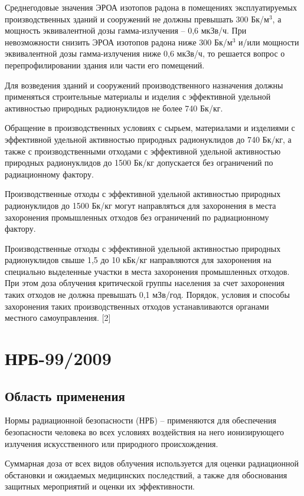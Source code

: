 	Среднегодовые значения ЭРОА изотопов радона в помещениях эксплуатируемых 
	производственных зданий и сооружений не должны превышать 300 Бк/м\(^3\), а 
	мощность эквивалентной дозы гамма-излучения -- 0,6 мкЗв/ч. При 
	невозможности снизить ЭРОА изотопов радона ниже 300 Бк/м\(^3\) и/или мощности 
	эквивалентной дозы гамма-излучения ниже 0,6 мкЗв/ч, то решается вопрос о 
	перепрофилировании здания или части его помещений.
	
	Для возведения зданий и сооружений производственного назначения должны 
	применяться строительные материалы и изделия с эффективной удельной 
	активностью природных радионуклидов не более 740 Бк/кг.
	
	Обращение в производственных условиях с сырьем, материалами и изделиями 
	с эффективной удельной активностью природных радионуклидов до 740 Бк/кг, 
	а также с производственными отходами с эффективной удельной активностью 
	природных радионуклидов до 1500 Бк/кг допускается без ограничений по 
	радиационному фактору.
	
	Производственные отходы с эффективной удельной активностью природных 
	радионуклидов до 1500 Бк/кг могут направляться для захоронения в места 
	захоронения промышленных отходов без ограничений по радиационному фактору.
	
	Производственные отходы с эффективной удельной активностью природных 
	радионуклидов свыше 1,5 до 10 кБк/кг направляются для захоронения на 
	специально выделенные участки в места захоронения промышленных отходов. 
	При этом доза облучения критической группы населения за счет захоронения 
	таких отходов не должна превышать 0,1 мЗв/год. Порядок, условия и способы 
	захоронения таких производственных отходов устанавливаются органами 
	местного самоуправления. [2]

\clearpage

\section{НРБ-99/2009} \label{sect2_1}
\subsection{Область применения} \label{subsect1_2_1}
	Нормы радиационной безопасности (НРБ) -- применяются для обеспечения 
	безопасности человека во всех условиях воздействия на него 
	ионизирующего излучения искусственного или природного происхождения.

	Суммарная доза от всех видов облучения используется для оценки 
	радиационной обстановки и ожидаемых медицинских последствий, а также 
	для обоснования защитных мероприятий и оценки их эффективности.
	
